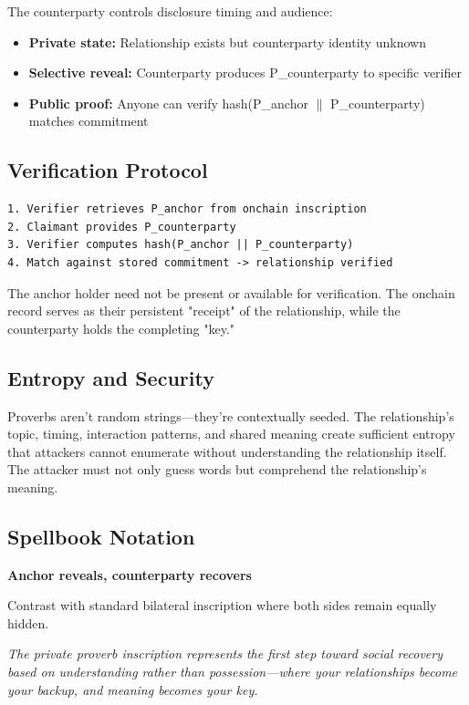 \documentclass[11pt,a4paper]{article}
\theoremstyle{definition}
\begin{document}
The counterparty controls disclosure timing and audience:

\begin{itemize}
    \item \textbf{Private state:} Relationship exists but counterparty identity unknown
    \item \textbf{Selective reveal:} Counterparty produces P\_counterparty to specific verifier
    \item \textbf{Public proof:} Anyone can verify hash(P\_anchor $\parallel$ P\_counterparty) matches commitment
\end{itemize}

\subsection{Verification Protocol}

\begin{verbatim}
1. Verifier retrieves P_anchor from onchain inscription
2. Claimant provides P_counterparty
3. Verifier computes hash(P_anchor || P_counterparty)
4. Match against stored commitment -> relationship verified
\end{verbatim}

The anchor holder need not be present or available for verification. The onchain record serves as their persistent "receipt" of the relationship, while the counterparty holds the completing "key."

\subsection{Entropy and Security}

Proverbs aren't random strings---they're contextually seeded. The relationship's topic, timing, interaction patterns, and shared meaning create sufficient entropy that attackers cannot enumerate without understanding the relationship itself. The attacker must not only guess words but comprehend the relationship's meaning.

\subsection{Spellbook Notation}

\textbf{Anchor reveals, counterparty recovers}

Contrast with standard bilateral inscription where both sides remain equally hidden.

\textit{The private proverb inscription represents the first step toward social recovery based on understanding rather than possession---where your relationships become your backup, and meaning becomes your key.}
\end{document}
